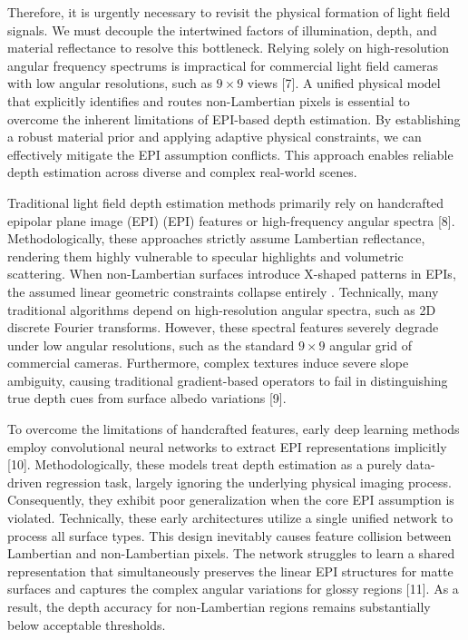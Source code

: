Therefore, it is urgently necessary to revisit the physical formation of light field signals. We must decouple the intertwined factors of illumination, depth, and material reflectance to resolve this bottleneck. Relying solely on high-resolution angular frequency spectrums is impractical for commercial light field cameras with low angular resolutions, such as $9 \times 9$ views [7]. A unified physical model that explicitly identifies and routes non-Lambertian pixels is essential to overcome the inherent limitations of EPI-based depth estimation. By establishing a robust material prior and applying adaptive physical constraints, we can effectively mitigate the EPI assumption conflicts. This approach enables reliable depth estimation across diverse and complex real-world scenes.

Traditional light field depth estimation methods primarily rely on handcrafted epipolar plane image (EPI) (EPI) features or high-frequency angular spectra [8]. Methodologically, these approaches strictly assume Lambertian reflectance, rendering them highly vulnerable to specular highlights and volumetric scattering. When non-Lambertian surfaces introduce X-shaped patterns in EPIs, the assumed linear geometric constraints collapse entirely . Technically, many traditional algorithms depend on high-resolution angular spectra, such as 2D discrete Fourier transforms. However, these spectral features severely degrade under low angular resolutions, such as the standard $9 \times 9$ angular grid of commercial cameras. Furthermore, complex textures induce severe slope ambiguity, causing traditional gradient-based operators to fail in distinguishing true depth cues from surface albedo variations [9].

To overcome the limitations of handcrafted features, early deep learning methods employ convolutional neural networks to extract EPI representations implicitly [10]. Methodologically, these models treat depth estimation as a purely data-driven regression task, largely ignoring the underlying physical imaging process. Consequently, they exhibit poor generalization when the core EPI assumption is violated. Technically, these early architectures utilize a single unified network to process all surface types. This design inevitably causes feature collision between Lambertian and non-Lambertian pixels. The network struggles to learn a shared representation that simultaneously preserves the linear EPI structures for matte surfaces and captures the complex angular variations for glossy regions [11]. As a result, the depth accuracy for non-Lambertian regions remains substantially below acceptable thresholds.

